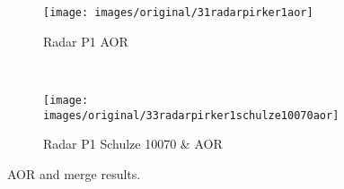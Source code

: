 \begin{figure}[htp] \centering
    \begin{subfigure}[b]{0.96\columnwidth}
        \texttt{[image: images/original/31radarpirker1aor]}
        \caption{Radar P1 AOR}
        \label{fig:31radarpirker1aor} 
    \end{subfigure}\\
        \begin{subfigure}[b]{0.96\columnwidth}
        \texttt{[image: images/original/33radarpirker1schulze10070aor]}
        \caption{Radar P1 Schulze 10070 & AOR}
        \label{fig:33radarpirker1schulze10070aor} 
    \end{subfigure}
    \caption{AOR and merge results.}
    \label{fig:35schulze10070aorradarandcloud}
\end{figure}